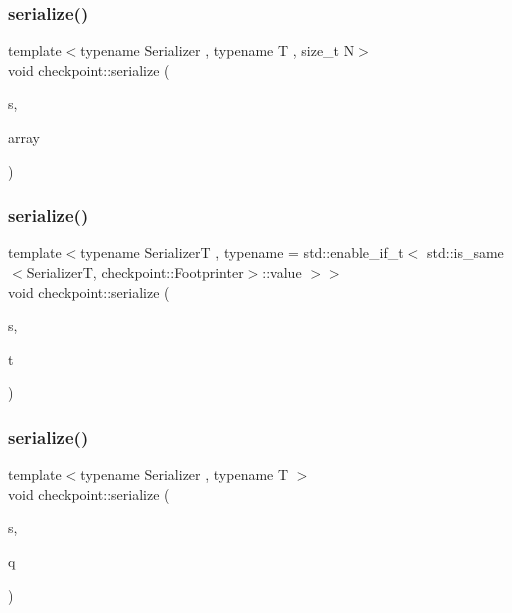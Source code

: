 \mbox{\label{namespacecheckpoint_a976e83bf5f22b7bfc5036fd829be039e}} 
\subsubsection{\texorpdfstring{serialize()}{serialize()}\hspace{0.1cm}{\footnotesize\ttfamily [4/29]}}
{\footnotesize\ttfamily template$<$typename Serializer , typename T , size\+\_\+t N$>$ \\
void checkpoint\+::serialize (\begin{DoxyParamCaption}\item[{\hyperlink{structcheckpoint_1_1_serializer}{Serializer} \&}]{s,  }\item[{std\+::array$<$ T, N $>$ \&}]{array }\end{DoxyParamCaption})}

\mbox{\label{namespacecheckpoint_ab9c05efe18a47d990fb20e84f73e9943}} 
\subsubsection{\texorpdfstring{serialize()}{serialize()}\hspace{0.1cm}{\footnotesize\ttfamily [5/29]}}
{\footnotesize\ttfamily template$<$typename SerializerT , typename  = std\+::enable\+\_\+if\+\_\+t$<$    std\+::is\+\_\+same$<$\+Serializer\+T, checkpoint\+::\+Footprinter$>$\+::value  $>$$>$ \\
void checkpoint\+::serialize (\begin{DoxyParamCaption}\item[{SerializerT \&}]{s,  }\item[{const std\+::thread \&}]{t }\end{DoxyParamCaption})}

\mbox{\label{namespacecheckpoint_a9493433bed418b54358130463961ce50}} 
\subsubsection{\texorpdfstring{serialize()}{serialize()}\hspace{0.1cm}{\footnotesize\ttfamily [6/29]}}
{\footnotesize\ttfamily template$<$typename Serializer , typename T $>$ \\
void checkpoint\+::serialize (\begin{DoxyParamCaption}\item[{\hyperlink{structcheckpoint_1_1_serializer}{Serializer} \&}]{s,  }\item[{const std\+::priority\+\_\+queue$<$ T $>$ \&}]{q }\end{DoxyParamCaption})}

